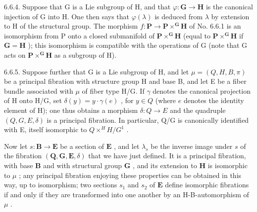 6.6.4. Suppose that G is a Lie subgroup of H, and that \(\varphi: \mathbf{G} \to \mathbf{H}\) is the canonical injection of G into H. One then says that \(\varphi(\lambda)\) is deduced from \(\lambda\) by extension to H of the structural group. The morphism \(f: \mathbf{P} \to \mathbf{P} \times^{\mathbf{G}} \mathbf{H}\) of No. 6.6.1 is an isomorphism from P onto a closed submanifold of \(\mathbf{P} \times^{\mathbf{G}} \mathbf{H}\) (equal to \(\mathbf{P} \times^{\mathbf{G}} \mathbf{H}\) if \(\mathbf{G} = \mathbf{H}\) ); this isomorphism is compatible with the operations of G (note that G acts on \(\mathbf{P} \times^{\mathbf{G}} \mathbf{H}\) as a subgroup of H).

6.6.5. Suppose further that G is a Lie subgroup of H, and let \(\mu = (Q, H, B, \pi)\) be a principal fibration with structure group H and base B, and let E be a fiber bundle associated with \(\mu\) of fiber type H/G. If \(\gamma\) denotes the canonical projection of H onto H/G, set \(\delta(y) = y \cdot \gamma(e)\) , for \(y \in Q\) (where \(e\) denotes the identity element of H); one thus obtains a morphism \(\delta: Q \to E\) and the quadruple \((Q, G, E, \delta)\) is a principal fibration. In particular, Q/G is canonically identified with E, itself isomorphic to \(Q \times^{H} H/G^{1}\) .

Now let \(s: \mathbf{B} \to \mathbf{E}\) be a section of \(\mathbf{E}\) , and let \(\lambda_s\) be the inverse image under \(s\) of the fibration \((\mathbf{Q}, \mathbf{G}, \mathbf{E}, \delta)\) that we have just defined. It is a principal fibration, with base \(\mathbf{B}\) and with structural group \(\mathbf{G}\) , and its extension to \(\mathbf{H}\) is isomorphic to \(\mu\) ; any principal fibration enjoying these properties can be obtained in this way, up to isomorphism; two sections \(s_1\) and \(s_2\) of \(\mathbf{E}\) define isomorphic fibrations if and only if they are transformed into one another by an H-B-automorphism of \(\mu\) .

